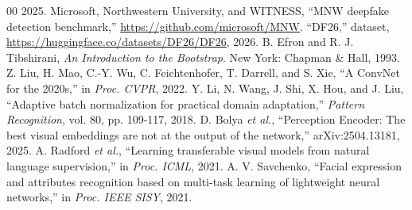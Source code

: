 \documentclass[conference]{IEEEtran}
\begin{document}
\begin{thebibliography}{00}
2025.
 Microsoft, Northwestern University, and WITNESS, ``MNW deepfake
detection benchmark,'' \url{https://github.com/microsoft/MNW}.
 ``DF26,'' dataset,
\url{https://huggingface.co/datasets/DF26/DF26}, 2026.
 B. Efron and R. J. Tibshirani, \textit{An Introduction to
the Bootstrap}. New York: Chapman \& Hall, 1993.
 Z. Liu, H. Mao, C.-Y. Wu, C. Feichtenhofer, T. Darrell, and
S. Xie, ``A ConvNet for the 2020s,'' in \textit{Proc. CVPR}, 2022.
 Y. Li, N. Wang, J. Shi, X. Hou, and J. Liu, ``Adaptive batch
normalization for practical domain adaptation,'' \textit{Pattern Recognition},
vol. 80, pp. 109-117, 2018.
 D. Bolya \textit{et al.}, ``Perception Encoder: The best visual
embeddings are not at the output of the network,'' arXiv:2504.13181, 2025.
 A. Radford \textit{et al.}, ``Learning transferable visual
models from natural language supervision,'' in \textit{Proc. ICML}, 2021.
 A. V. Savchenko, ``Facial expression and attributes
recognition based on multi-task learning of lightweight neural networks,'' in
\textit{Proc. IEEE SISY}, 2021.
\end{thebibliography}
\end{document}
